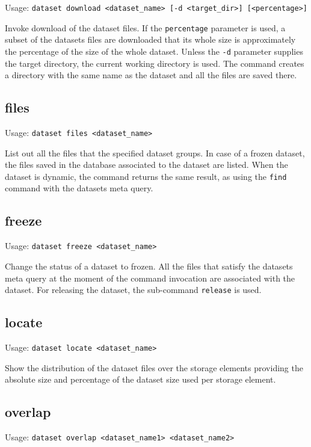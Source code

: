 Usage: \texttt{dataset download <dataset\_name>  [-d <target\_dir>]
[<percentage>]}

Invoke download of the dataset files. If the \texttt{percentage}
parameter is used, a subset of the datasets files are downloaded
that its whole size is approximately the percentage of the size
of the whole dataset. Unless the \texttt{-d} parameter supplies the
target directory, the current working directory is used. The
command creates a directory with the same name as the dataset and
all the files are saved there.

\subsection{files}

Usage: \texttt{dataset files <dataset\_name>}

List out all the files that the specified dataset groups. In case
of a frozen dataset, the files saved in the database associated
to the dataset are listed. When the dataset is dynamic, the command
returns the same result, as using the \texttt{find} command with
the datasets meta query.

\subsection{freeze}

Usage: \texttt{dataset freeze <dataset\_name>}

Change the status of a dataset to frozen. All the files that
satisfy the datasets meta query at the moment of the command
invocation are associated with the dataset. For releasing the
dataset, the sub-command \texttt{release} is used.

\subsection{locate}

Usage: \texttt{dataset locate <dataset\_name>}

Show the distribution of the dataset files over the storage
elements providing the absolute size and percentage of the dataset
size used per storage element.

\subsection{overlap}

Usage: \texttt{dataset overlap <dataset\_name1> <dataset\_name2> }


